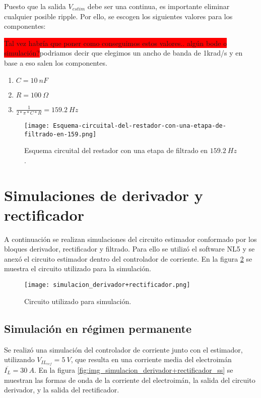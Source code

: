 Puesto que la salida $V_{estim}$ debe ser una continua, es importante eliminar cualquier posible ripple. Por ello, se escogen los siguientes valores para los componentes:

\colorbox{red}{Tal vez habría que poner como conseguimos estos valores.. algún bode o simulación?}podriamos decir que elegimos un ancho de banda de 1krad/s y en base a eso salen los componentes.

\begin{enumerate}
	\item  $C=10\: nF$
	
	\item  $R=100\:\Omega$
	
	\item  $\frac{1}{2*\pi *C*R}=159.2\: Hz$
\end{enumerate}

\begin{figure}[H]
	\centering
	\texttt{[image: Esquema-circuital-del-restador-con-una-etapa-de-filtrado-en-159.png]}
	\caption{Esquema circuital del restador con una etapa de filtrado en $159.2\: Hz$.}
	\label{fig:img_Esquema-circuital-del-restador-con-una-etapa-de-filtrado-en-159}
\end{figure}


\section{Simulaciones de derivador y rectificador}

A continuación se realizan simulaciones del circuito estimador conformado por los bloques derivador, rectificador y filtrado. Para ello se utilizó el software NL5 y se anexó el circuito estimador dentro del controlador de corriente. En la figura \ref{fig:img_simulacion_derivador+rectificador} se muestra el circuito utilizado para la simulación.

\begin{figure}[H]
	\centering
	\texttt{[image: simulacion\_derivador+rectificador.png]}
	\caption{Circuito utilizado para simulación.}
	\label{fig:img_simulacion_derivador+rectificador}
\end{figure}

\subsection{Simulación en régimen permanente} \label{sec_simulacion_estimador_basico}

Se realizó una simulación del controlador de corriente junto con el estimador, utilizando $V_{IL_{ref}}=5\:V$, que resulta en una corriente media del electroimán $\overline{I_L}=30\:A$. En la figura \ref{fig:img_simulacion_derivador+rectificador_ss} se muestran las formas de onda de la corriente del electroimán, la salida del circuito derivador, y la salida del rectificador. 

